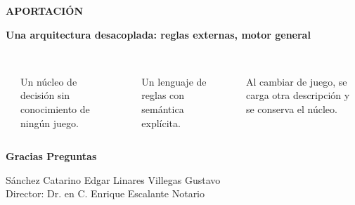 \documentclass[aspectratio=169,10pt,t]{beamer}
\begin{document}
{
\begin{frame}[plain,t]
\color{marfil}
\vspace{0.5cm}
{\fontsize{7}{9}\selectfont\bfseries\color{vinoclaro} APORTACIÓN}\par\vspace{3pt}
{\fontsize{18}{21}\selectfont\bfseries Una arquitectura desacoplada: reglas externas, motor general\par}
\vspace{0.6cm}
\begin{columns}[T]
\rule{\linewidth}{1.2pt}\\[3pt]
{\small Un núcleo de decisión sin conocimiento de ningún juego.}
\rule{\linewidth}{1.2pt}\\[3pt]
{\small Un lenguaje de reglas con semántica explícita.}
\rule{\linewidth}{1.2pt}\\[3pt]
{\small Al cambiar de juego, se carga otra descripción y se conserva el núcleo.}
\end{columns}
\vspace{0.8cm}
{\fontsize{20}{24}\selectfont\bfseries Gracias \textperiodcentered{} Preguntas\par}
\vspace{0.4cm}
{\footnotesize\color{vinoclaro} Sánchez Catarino Edgar \textperiodcentered{} Linares Villegas Gustavo\\ Director: Dr. en C. Enrique Escalante Notario\par}
\end{frame}
}

\appendix
\end{document}
